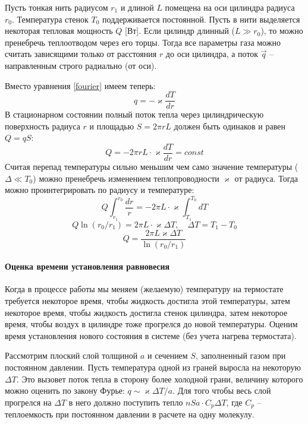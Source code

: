 \documentclass[a4paper,12pt]{report}
\begin{document}
    Пусть тонкая нить радиусом $r_1$ и длиной $L$ помещена на оси цилиндра радиуса $r_0$. Температура стенок $T_0$ поддерживается постоянной. Пусть в нити выделяется некоторая тепловая мощность $Q$ [Вт]. Если цилиндр длинный ($L\gg r_0$), то можно пренебречь теплоотводом через его торцы. Тогда все параметры газа можно считать зависящими только от расстояния $r$ до оси цилиндра, а поток $\vec{q}$ -- направленным строго радиально (от оси).

    Вместо уравнения \eqref{fourier} имеем теперь:
    \begin{equation}
        \label{q new}
        q=-\varkappa\frac{dT}{dr}
    \end{equation}
    В стационарном состоянии полный поток тепла через цилиндрическую поверхность радиуса $r$ и площадью $S=2\pi rL$ должен быть одинаков и равен $Q=qS$:
    \begin{equation}
        \label{Q}
        Q=-2\pi r L\cdot \varkappa \frac{dT}{dr}=const
    \end{equation}
    Считая перепад температуры сильно меньшим чем само значение температуры ($\Delta \ll T_0$) можно пренебречь изменением теплопроводности $\varkappa$ от радиуса. Тогда можно проинтегрировать по радиусу и температуре:
    \begin{equation*}
        Q\int_{r_1}^{r_0}\frac{dr}{r}=-2\pi L\cdot \varkappa  \int_{T_1}^{T_0}dT 
    \end{equation*}
    \begin{equation*}
        Q\ln(r_0/r_1)=2\pi L \cdot \varkappa \Delta T, \quad \Delta T=T_1-T_0
    \end{equation*}
    \begin{equation}
        \label{Qfinal}
        Q=\frac{2\pi L\varkappa\Delta T}{\ln (r_0/r_1)}
    \end{equation}

    \paragraph*{Оценка времени установления равновесия} Когда в процессе работы мы меняем (желаемую) температуру на термостате требуется некоторое время, чтобы жидкость достигла этой температуры, затем некоторое время, чтобы жидкость достигла стенок цилиндра, затем некоторое время, чтобы воздух в цилиндре тоже прогрелся до новой температуры. Оценим время установления нового состояния в системе (без учета нагрева термостата).

    Рассмотрим плоский слой толщиной $a$ и сечением $S$, заполненный газом при постоянном давлении. Пусть температура одной из граней выросла на некоторую $\Delta T$. Это вызовет поток тепла в сторону более холодной грани, величину которого можно оценить по закону Фурье: $q\sim \varkappa \Delta T/a$. Для того чтобы весь слой прогрелся на $\Delta T$ в него должно поступить тепло $nSa\cdot C_p\Delta T$, где $C_p$ -- теплоемкость при постоянном давлении в расчете на одну молекулу.
\end{document}
